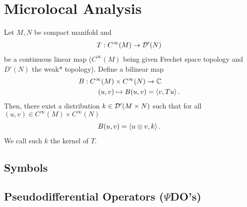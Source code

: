 \documentclass{article}
\title{}
\date{}
\begin{document}
\section{Microlocal Analysis}
\begin{ftheorem} Let $M, N$ be compact manifold and 
\begin{align*}
T: C^\infty(M) \to \D'(N) \\
\end{align*}
be a continuous linear map ($C^\infty(M)$ being given Frechet space topology and $D'(N)$ the weak* topology). Define a bilinear map 
\begin{align*}
B: C^\infty(M) &\times C^\infty(N) \to \C \\
(u, v) &\mapsto B(u, v) = \inprod[v, Tu]. 
\end{align*}
Then, there exist a distribution $k \in \D'(M \times N)$ such that for all $(u, v) \in C^\infty(M) \times C^\infty(N)$
\begin{align*}
B(u, v) = \inprod[u \otimes v, k]. 
\end{align*}
We call such $k$ the kernel of $T$. 
\end{ftheorem}



\subsection{Symbols}

\subsection{Pseudodifferential Operators ($\Psi$DO's)}






\end{document}

